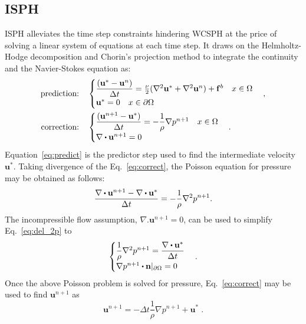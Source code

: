 \subsection{ISPH}
\label{sec:ISPH}
ISPH alleviates the time step constraints hindering WCSPH at the price of solving a linear system of equations at each time step. It draws on the Helmholtz-Hodge decomposition and Chorin's projection method \cite{chorin1968numerical} to integrate the continuity and the Navier-Stokes equation as:
\begin{align}
\text{prediction:} \quad &\begin{cases}\label{eq:predict} 
\dfrac{(\mathbf{u}^*-\mathbf{u}^n)}{\Delta t}=\frac{\nu}{2}(\nabla^2\mathbf{u}^* +\nabla^2\mathbf{u}^n) + \mathbf{f}^b\quad x\in \Omega\\
\mathbf{u}^*=0 \quad x\in \partial\Omega\\
\end{cases},\\
\text{correction:} \quad &\begin{cases}\label{eq:correct} 
\dfrac{(\mathbf{u}^{n+1}-\mathbf{u}^*)}{\Delta t}=-\dfrac{1}{\rho} \nabla p^{n+1}\quad x\in \Omega\\
\nabla\bigcdot \mathbf{u}^{n+1}=0
\end{cases}.
\end{align}
Equation~\ref{eq:predict} is the predictor step used to find the intermediate velocity $\mathbf{u}^*$. Taking divergence of the Eq.~\ref{eq:correct}, the Poisson equation for pressure may be obtained as follows: 
\begin{equation}\label{eq:del_2p}
\dfrac{\nabla \bigcdot \mathbf{u}^{n+1}-\nabla\bigcdot \mathbf{u}^*}{\Delta t}=-\dfrac{1}{\rho} \nabla^2 p^{n+1}.
\end{equation}
The incompressible flow assumption, $\nabla . \mathbf{u}^{n+1} =0$, can be used to simplify Eq.~\ref{eq:del_2p} to 
\begin{equation}\label{eq:pressure}
\begin{cases}
\dfrac{1}{\rho} \nabla^2 p^{n+1}=\dfrac{\nabla\bigcdot \mathbf{u}^*}{\Delta t}\\
\nabla p^{n+1}\bigcdot \mathbf{n}|_{\partial \Omega}=0
\end{cases}
.
\end{equation}
Once the above Poisson problem is solved for pressure, Eq.~\ref{eq:correct} may be used to find $\mathbf{u}^{n+1}$ as
\begin{equation*}
\mathbf{u}^{n+1}=-{\Delta t}\dfrac{1}{\rho} \nabla p^{n+1}+\mathbf{u}^* \;.
\end{equation*}
